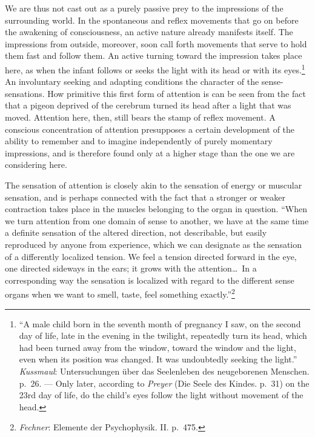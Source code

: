 \documentclass[12pt,a4paper]{book}
\newcommand{\opage}[1]{\marginnote{\footnotesize\textit{[#1]}}}
\begin{document}
We are thus not cast out as a purely passive prey to the impressions of
the surrounding world. In the spontaneous and reflex movements that go
on before the awakening of consciousness, an active nature already
manifests itself. The impressions from outside, moreover, soon call
forth movements that serve to hold them fast and follow them. An active
turning toward the impression takes place here, as when the infant
follows or seeks the light with its head or with its
eyes.\footnote{``A male child born in the seventh month of pregnancy I
saw, on the second day of life, late in the evening in the twilight,
repeatedly turn its head, which had been turned away from the window,
toward the window and the light, even when its position was changed. It
was undoubtedly seeking the light.'' \emph{Kussmaul}: Untersuchungen
über das Seelenleben des neugeborenen Menschen. p.~26. --- Only later,
according to \emph{Preyer} (Die Seele des Kindes. p.~31) on the 23rd day
of life, do the child's eyes follow the light without movement of the
head.} An involuntary seeking and adapting conditions the character of
the sense-sensations. How primitive this first form of attention is can
be seen from the fact that a pigeon deprived of the cerebrum turned its
head after a light that was moved. Attention here, then, still bears the
stamp of reflex movement. A conscious concentration of attention
presupposes a certain development of the ability to remember and to
imagine independently of purely momentary impressions, and is therefore
found only at a higher stage than the one we are considering here.

The sensation of attention is closely akin to the sensation of energy or
muscular sensation, and is perhaps connected
\opage{149}with the fact that a stronger or weaker contraction takes place
in the muscles belonging to the organ in question. ``When we turn
attention from one domain of sense to another, we have at the same time
a definite sensation of the altered direction, not describable, but
easily reproduced by anyone from experience, which we can designate as
the sensation of a differently localized tension. We feel a tension
directed forward in the eye, one directed sideways in the ears; it grows
with the attention\ldots\ In a corresponding way the sensation is
localized with regard to the different sense organs when we want to
smell, taste, feel something
exactly.''\footnote{\emph{Fechner}: Elemente der Psychophysik. II.
p.~475.}
\end{document}
